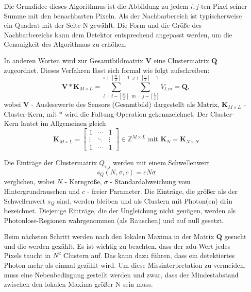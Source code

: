 \noindent
Die Grundidee dieses Algorithmus ist die Abbildung zu jedem $i,j$-ten Pixel seiner Summe mit den benachbarten Pixeln. Als der Nachbarbereich ist typischerweise ein Quadrat mit der Seite N gewählt. Die Form und die Größe des Nachbarbereichs kann dem Detektor entsprechend angepasst werden, um die Genauigkeit des Algorithmus zu erhöhen.

\noindent
In anderen Worten wird zur Gesamtbildmatrix $\mathbf{V}$ eine Clustermatrix $\mathbf{Q}$ zugeordnet. Dieses Verfahren lässt sich formal wie folgt aufschreiben:
\begin{equation}
    \mathbf{V} * \mathbf{K}_{M\times L} = \sum_{l=i-\left[\frac{\text{M}}{2}\right]}^{i+\left[\frac{\text{M}}{2}\right]-1} \sum_{m=j-\left[\frac{\text{L}}{2}\right]}^{j+\left[\frac{\text{L}}{2}\right]-1} V_{l,m} = \mathbf{Q},
\end{equation}
wobei $\mathbf{V}$ - Auslesewerte des Sensors (Gesamtbild) dargestellt als Matrix, $\mathbf{K}_{M \times L}$ - Cluster-Kern, mit $*$ wird die Faltung-Operation gekennzeichnet. Der Cluster-Kern lautet im Allgemeinen gleich
\begin{equation}
    \mathbf{K}_{M \times L}  = \begin{bmatrix}
1 & \cdots & 1\\
\vdots & \ddots & \vdots\\
1 & \cdots & 1
\end{bmatrix}
\in \mathbb{Z}^{M \times L} \text{ mit } \mathbf{K}_N = \mathbf{K}_{N \times N}
\end{equation}

\noindent
Die Einträge der Clustermatrix $Q_{i,j}$ werden mit einem Schwellenwert 
\begin{equation}
    s_Q(N, \sigma, c) = cN\sigma
\end{equation}
verglichen, wobei $N$ - Kerngröße, $\sigma$ - Standardabweichung vom Hintergrundrauschen und $c$ - freier Parameter. Die Einträge, die größer als der Schwellenwert $s_Q$ sind, werden bleiben und als Clustern mit Photon(en) drin bezeichnet. Diejenige Einträge, die der Ungleichung nicht genügen, werden als Photonlose-Regionen wahrgenommen (als Rauschen) und auf null gesetzt.

\noindent
Beim nächsten Schritt werden nach den lokalen Maxima in der Matrix $\mathbf{Q}$ gesucht und die werden gezählt. Es ist wichtig zu beachten, dass der \gls{adu}-Wert jedes Pixels taucht in $N^2$ Clustern auf. Das kann dazu führen, dass ein detektiertes Photon mehr als einmal gezählt wird. Um diese Missinterpretation zu vermeiden, muss eine Nebenbedingung gestellt werden und zwar, dass der Mindestabstand zwischen den lokalen Maxima größer N sein muss.

